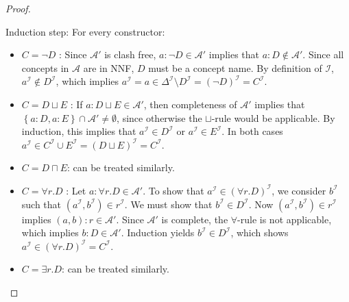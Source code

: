\begin{proof}
\begin{itemize}
			Induction step: For every constructor:
			\begin{itemize}
				\item $C = \neg D$ : Since $\mathcal{A}'$ is clash free, $a : \neg D \in \mathcal{A}'$ implies that $a : D \notin \mathcal{A}'$.
					Since all concepts in $\mathcal{A}$ are in NNF, $D$ must be a concept name.
					By definition of $\mathcal{I}$, $a^\mathcal{I} \notin D^\mathcal{I}$,
					which implies $a^\mathcal{I} = a \in \Delta^\mathcal{I} \setminus D^\mathcal{I} = (\neg D)^\mathcal{I} = C^\mathcal{I}$.
				\item $C = D \sqcup E$ : If $a : D \sqcup E \in \mathcal{A}'$, then completeness of $\mathcal{A}'$ implies that
					$\left\{ a:D, a:E \right\} \cap \mathcal{A}' \neq \emptyset$, since otherwise the $\sqcup$-rule would be applicable.
					By induction, this implies that $a^\mathcal{I} \in D^\mathcal{I}$ or $a^\mathcal{I} \in E^\mathcal{I}$.
					In both cases $a^\mathcal{I} \in C^\mathcal{I} \cup E^\mathcal{I} = (D \sqcup E)^\mathcal{I} = C^\mathcal{I}$.
				\item $C = D \sqcap E$: can be treated similarly.
				\item $C = \forall r.D$ : Let $a : \forall r.D \in \mathcal{A}'$.
					To show that $a^\mathcal{I} \in (\forall r.D)^\mathcal{I}$, we consider $b^\mathcal{I}$ such that $(a^\mathcal{I}, b^\mathcal{I}) \in r^\mathcal{I}$.
					We must show that $b^\mathcal{I} \in D^\mathcal{I}$.
					Now $(a^\mathcal{I}, b^\mathcal{I}) \in r^\mathcal{I}$ implies $(a,b) : r \in \mathcal{A}'$.
					Since $\mathcal{A}'$ is complete, the $\forall$-rule is not applicable, which implies $b : D \in \mathcal{A}'$.
					Induction yields $b^\mathcal{I} \in D^\mathcal{I}$, which shows $a^\mathcal{I} \in (\forall r.D)^\mathcal{I} = C^\mathcal{I}$.
				\item $C = \exists r.D$: can be treated similarly.
					\qedhere
			\end{itemize}
	\end{itemize}
\end{proof}
